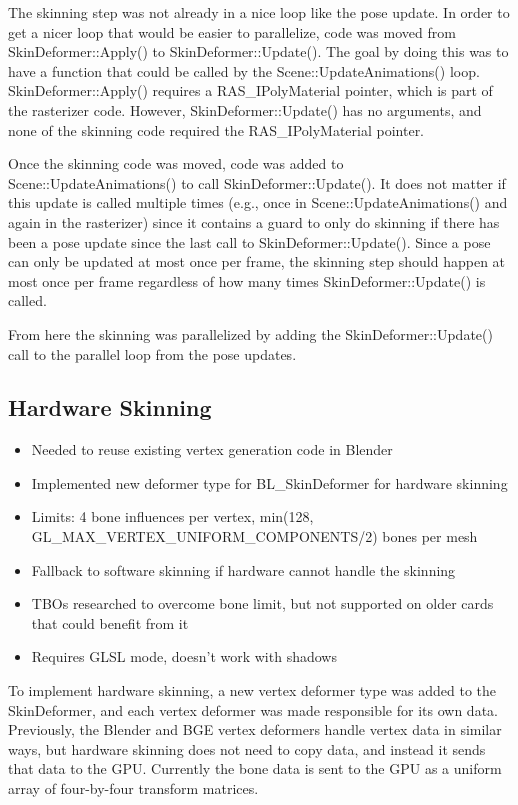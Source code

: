 The skinning step was not already in a nice loop like the pose update.
In order to get a nicer loop that would be easier to parallelize, code was moved from SkinDeformer::Apply() to SkinDeformer::Update().
The goal by doing this was to have a function that could be called by the Scene::UpdateAnimations() loop.
SkinDeformer::Apply() requires a RAS\_IPolyMaterial pointer, which is part of the rasterizer code.
However, SkinDeformer::Update() has no arguments, and none of the skinning code required the RAS\_IPolyMaterial pointer.

Once the skinning code was moved, code was added to Scene::UpdateAnimations() to call SkinDeformer::Update().
It does not matter if this update is called multiple times (e.g., once in Scene::UpdateAnimations() and again in the rasterizer) since it contains a guard to only do skinning if there has been a pose update since the last call to SkinDeformer::Update().
Since a pose can only be updated at most once per frame, the skinning step should happen at most once per frame regardless of how many times SkinDeformer::Update() is called.

From here the skinning was parallelized by adding the SkinDeformer::Update() call to the parallel loop from the pose updates.

\subsection{Hardware Skinning}
\ifsummaries
\begin{itemize}
 \item Needed to reuse existing vertex generation code in Blender
 \item Implemented new deformer type for BL\_SkinDeformer for hardware skinning
 \item Limits: 4 bone influences per vertex, min(128, GL\_MAX\_VERTEX\_UNIFORM\_COMPONENTS/2) bones per mesh
 \item Fallback to software skinning if hardware cannot handle the skinning
 \item TBOs researched to overcome bone limit, but not supported on older cards that could benefit from it
 \item Requires GLSL mode, doesn't work with shadows
\end{itemize}
\fi

\label{sec:hardware_skinning}

To implement hardware skinning, a new vertex deformer type was added to the SkinDeformer, and each vertex deformer was made responsible for its own data.
Previously, the Blender and BGE vertex deformers handle vertex data in similar ways, but hardware skinning does not need to copy data, and instead it sends that data to the GPU.
Currently the bone data is sent to the GPU as a uniform array of four-by-four transform matrices.

